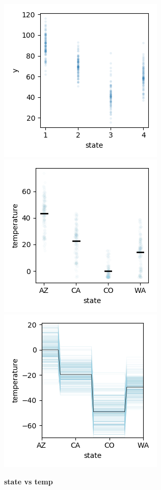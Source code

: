 \documentclass[12pt]{article}
\begin{document}
\begin{figure}[htbp]
\begin{center}
\includegraphics[scale=0.7]{images/state_vs_temp.png}
\includegraphics[scale=0.7]{images/state_vs_temp_stratpd.png}
\includegraphics[scale=0.7]{images/state_vs_temp_pdp.png}
\caption{{\bf  state  vs temp}}
\label{fig:state_vs_temp}
\end{center}
\end{figure}
\end{document}
